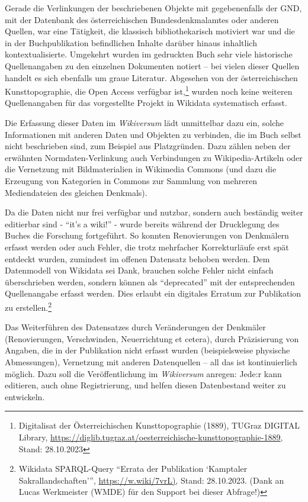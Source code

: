 \documentclass[a4paper,
fontsize=11pt,
oneside,
numbers=noperiodatend,
parskip=half-,
bibliography=totoc,
final
]{scrartcl}
\begin{document}
Gerade die Verlinkungen der beschriebenen Objekte mit gegebenenfalls der
GND, mit der Datenbank des österreichischen Bundesdenkmalamtes oder
anderen Quellen, war eine Tätigkeit, die klassisch bibliothekarisch
motiviert war und die in der Buchpublikation befindlichen Inhalte
darüber hinaus inhaltlich kontextualisierte. Umgekehrt wurden im
gedruckten Buch sehr viele historische Quellenangaben zu den einzelnen
Dokumenten notiert -- bei vielen dieser Quellen handelt es sich
ebenfalls um graue Literatur. Abgesehen von der österreichischen
Kunsttopographie, die Open Access verfügbar ist,\footnote{Digitalisat
  der Österreichischen Kunsttopographie (1889), TUGraz DIGITAL Library,
  \url{https://diglib.tugraz.at/oesterreichische-kunsttopographie-1889},
  Stand: 28.10.2023} wurden noch keine weiteren Quellenangaben für das
vorgestellte Projekt in Wikidata systematisch erfasst.

Die Erfassung dieser Daten im \emph{Wikiversum} lädt unmittelbar dazu
ein, solche Informationen mit anderen Daten und Objekten zu verbinden,
die im Buch selbst nicht beschrieben sind, zum Beispiel aus
Platzgründen. Dazu zählen neben der erwähnten Normdaten-Verlinkung auch
Verbindungen zu Wikipedia-Artikeln oder die Vernetzung mit
Bildmaterialien in Wikimedia Commons (und dazu die Erzeugung von
Kategorien in Commons zur Sammlung von mehreren Mediendateien des
gleichen Denkmals).

Da die Daten nicht nur frei verfügbar und nutzbar, sondern auch
beständig weiter editierbar sind - \enquote{it's a wiki!} - wurde
bereits während der Drucklegung des Buches die Forschung fortgeführt. So
konnten Renovierungen von Denkmälern erfasst werden oder auch Fehler,
die trotz mehrfacher Korrekturläufe erst spät entdeckt wurden, zumindest
im offenen Datensatz behoben werden. Dem Datenmodell von Wikidata sei
Dank, brauchen solche Fehler nicht einfach überschrieben werden, sondern
können als \enquote{deprecated} mit der entsprechenden Quellenangabe
erfasst werden. Dies erlaubt ein digitales Erratum zur Publikation zu
erstellen.\footnote{Wikidata SPARQL-Query \enquote{Errata der
  Publikation \enquote*{Kamptaler Sakrallandschaften}},
  \url{https://w.wiki/7vrL)}, Stand: 28.10.2023. (Dank an Lucas
  Werkmeister (WMDE) für den Support bei dieser Abfrage!)}



Das Weiterführen des Datensatzes durch Veränderungen der Denkmäler
(Renovierungen, Verschwinden, Neuerrichtung et cetera), durch
Präzisierung von Angaben, die in der Publikation nicht erfasst wurden
(beispielsweise physische Abmessungen), Vernetzung mit anderen
Datenquellen -- all das ist kontinuierlich möglich. Dazu soll die
Veröffentlichung im \emph{Wikiversum} anregen: Jede:r kann editieren,
auch ohne Registrierung, und helfen diesen Datenbestand weiter zu
entwickeln.
\end{document}
